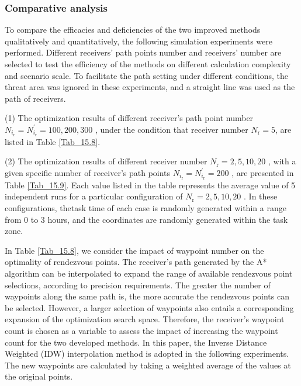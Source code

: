 \subsubsection{Comparative analysis}

To compare the efficacies and deficiencies of the two improved methods qualitatively and quantitatively, the following simulation experiments were performed. Different receivers' path points number and receivers' number are selected to test the efficiency of the methods on different calculation complexity and scenario scale. To facilitate the path setting under different conditions, the threat area was ignored in these experiments, and a straight line was used as the path of receivers.

(1) The optimization results of different receiver's path point number $N_{i_{\text{r}}}=N_{i_{\text{r}}}^{\prime}=100,200,300$ , under the condition that receiver number $N_\text{r}=5$, are listed in Table \ref{Tab_15.8}.

(2) The optimization results of different receiver number $N_\text{r}=2,5,10,20$ , with a given specific number of receiver's path points $N_{i_{\text{r}}}=N_{i_{\text{r}}}^{\prime}=200$ , are presented in Table \ref{Tab_15.9}. Each value listed in the table represents the average value of 5 independent runs for a particular configuration of $N_\text{r}=2,5,10,20$ . In these configurations, thetask time of each case is randomly generated within a range from 0 to 3 hours, and the coordinates are randomly generated within the task zone.

In Table \ref{Tab_15.8}, we consider the impact of waypoint number on the optimality of rendezvous points. The receiver's path generated by the A* algorithm can be interpolated to expand the range of available rendezvous point selections, according to precision requirements. The greater the number of waypoints along the same path is, the more accurate the rendezvous points can be selected. However, a larger selection of waypoints also entails a corresponding expansion of the optimization search space. Therefore, the receiver's waypoint count is chosen as a variable to assess the impact of increasing the waypoint count for the two developed methods. In this paper, the Inverse Distance Weighted (IDW) interpolation method is adopted in the following experiments. The new waypoints are calculated by taking a weighted average of the values at the original points.


